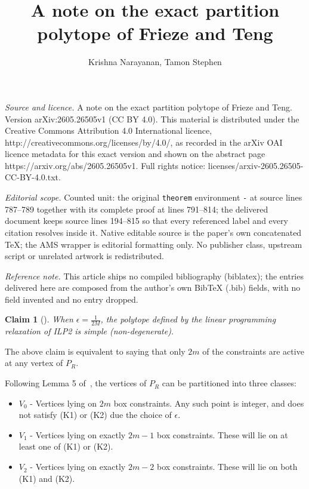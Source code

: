 \documentclass[10pt,a4paper]{amsart}
\newtheorem{claim}[theorem]{Claim}
\begin{document}
\title[A note on the exact partition polytope of Frieze and Teng]{A note on the exact partition polytope of Frieze and Teng}
\author{Krishna Narayanan, Tamon Stephen}
\date{}
\maketitle
\noindent\emph{Source and licence.} A note on the exact partition polytope of Frieze and Teng. Version arXiv:2605.26505v1 (CC BY 4.0). This material is distributed under the Creative Commons Attribution 4.0 International licence, http://creativecommons.org/licenses/by/4.0/, as recorded in the arXiv OAI licence metadata for this exact version and shown on the abstract page https://arxiv.org/abs/2605.26505v1. Full rights notice: licenses/arxiv-2605.26505-CC-BY-4.0.txt.\par\smallskip
\noindent\textit{Editorial scope.} Counted unit: the original \texttt{theorem} environment \texttt{-} at source lines 787--789 together with its complete proof at lines 791--814; the delivered document keeps source lines 194--815 so that every referenced label and every citation resolves inside it. Native editable source is the paper's own concatenated TeX; the AMS wrapper is editorial formatting only. No publisher class, upstream script or unrelated artwork is redistributed.
\par\smallskip\noindent\textit{Reference note.} This article ships no compiled bibliography (biblatex); the entries delivered here are composed from the author's own BibTeX (.bib) fields, with no field invented and no entry dropped.
\begin{claim}[\cite{FT94}]\label{nondegLPre}
    When \(\epsilon = \frac{1}{2M}\), the polytope defined by the linear programming relaxation of ILP2 is simple (non-degenerate).
\end{claim}
The above claim is equivalent to saying that only $2m$ of the constraints are active at any vertex of $P_R$. 

Following Lemma 5 of~\cite{FT94}, the vertices of $P_R$ can be partitioned into three classes:
\begin{itemize}
    \item[] $V_0$ - Vertices lying on $2m$ box constraints. Any such point is integer, and does not satisfy (K1) or (K2) due the choice of $\epsilon$. 
    \item[] $V_1$ - Vertices lying on exactly $2m-1$ box constraints.  These will lie on at least one of (K1) or (K2). 
    \item[] $V_2$ - Vertices lying on exactly $2m-2$ box constraints.  These will lie on both (K1) and (K2).
\end{itemize}
\end{document}
